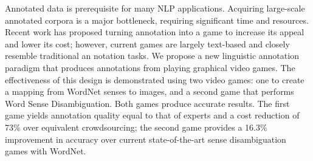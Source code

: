 Annotated data is prerequisite for many NLP applications. Acquiring large-scale annotated corpora is a major bottleneck, requiring significant time and resources. Recent work has proposed turning annotation into a game to increase its appeal and lower its cost; however, current games are largely text-based and closely resemble traditional an notation tasks. We propose a new linguistic annotation paradigm that produces annotations from playing graphical video games. The effectiveness of this design is demonstrated using two video games: one to create a mapping from WordNet senses to images, and a second game that performs Word Sense Disambiguation. Both games produce accurate results. The first game yields annotation quality equal to that of experts and a cost reduction of 73\% over equivalent crowdsourcing; the second game provides a 16.3\% improvement in accuracy over current state-of-the-art sense disambiguation games with WordNet.
